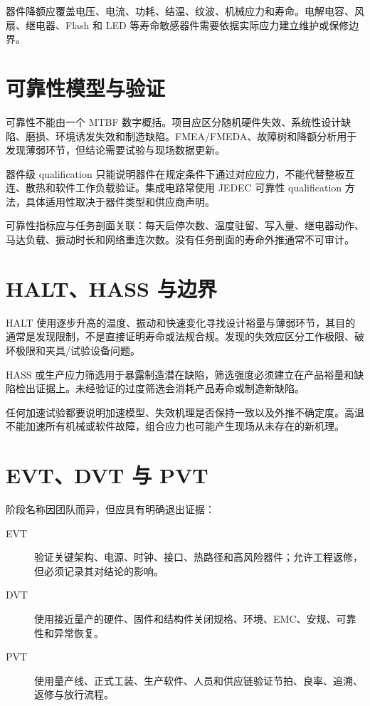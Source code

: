 器件降额应覆盖电压、电流、功耗、结温、纹波、机械应力和寿命。电解电容、风扇、继电器、Flash 和 LED 等寿命敏感器件需要依据实际应力建立维护或保修边界。

\section{可靠性模型与验证}

可靠性不能由一个 MTBF 数字概括。项目应区分随机硬件失效、系统性设计缺陷、磨损、环境诱发失效和制造缺陷。FMEA/FMEDA、故障树和降额分析用于发现薄弱环节，但结论需要试验与现场数据更新。

器件级 qualification 只能说明器件在规定条件下通过对应应力，不能代替整板互连、散热和软件工作负载验证。集成电路常使用 JEDEC 可靠性 qualification 方法，具体适用性取决于器件类型和供应商声明\cite{jedec-jesd47}。

可靠性指标应与任务剖面关联：每天启停次数、温度驻留、写入量、继电器动作、马达负载、振动时长和网络重连次数。没有任务剖面的寿命外推通常不可审计。

\section{HALT、HASS 与边界}

HALT 使用逐步升高的温度、振动和快速变化寻找设计裕量与薄弱环节，其目的通常是发现限制，不是直接证明寿命或法规合规。发现的失效应区分工作极限、破坏极限和夹具/试验设备问题。

HASS 或生产应力筛选用于暴露制造潜在缺陷，筛选强度必须建立在产品裕量和缺陷检出证据上。未经验证的过度筛选会消耗产品寿命或制造新缺陷。

任何加速试验都要说明加速模型、失效机理是否保持一致以及外推不确定度。高温不能加速所有机械或软件故障，组合应力也可能产生现场从未存在的新机理。

\section{EVT、DVT 与 PVT}

阶段名称因团队而异，但应具有明确退出证据：

\begin{description}
  \item[EVT] 验证关键架构、电源、时钟、接口、热路径和高风险器件；允许工程返修，但必须记录其对结论的影响。
  \item[DVT] 使用接近量产的硬件、固件和结构件关闭规格、环境、EMC、安规、可靠性和异常恢复。
  \item[PVT] 使用量产线、正式工装、生产软件、人员和供应链验证节拍、良率、追溯、返修与放行流程。
\end{description}

